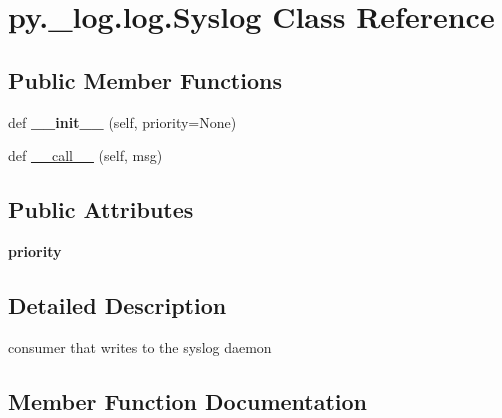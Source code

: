 \hypertarget{classpy_1_1__log_1_1log_1_1_syslog}{}\section{py.\+\_\+log.\+log.\+Syslog Class Reference}
\label{classpy_1_1__log_1_1log_1_1_syslog}
\subsection*{Public Member Functions}
\begin{DoxyCompactItemize}
\item 
\mbox{\label{classpy_1_1__log_1_1log_1_1_syslog_a7349715cc30db1de8f425641ca263a0d}} 
def {\bfseries \+\_\+\+\_\+init\+\_\+\+\_\+} (self, priority=None)
\item 
def \hyperlink{classpy_1_1__log_1_1log_1_1_syslog_a56f929eab902359ffb2b43a7100d8b4c}{\+\_\+\+\_\+call\+\_\+\+\_\+} (self, msg)
\end{DoxyCompactItemize}
\subsection*{Public Attributes}
\begin{DoxyCompactItemize}
\item 
\mbox{\label{classpy_1_1__log_1_1log_1_1_syslog_a191cefce6dae79fbf33382d7db29c320}} 
{\bfseries priority}
\end{DoxyCompactItemize}


\subsection{Detailed Description}
\begin{DoxyVerb}consumer that writes to the syslog daemon \end{DoxyVerb}
 

\subsection{Member Function Documentation}
\mbox{\label{classpy_1_1__log_1_1log_1_1_syslog_a56f929eab902359ffb2b43a7100d8b4c}} 
